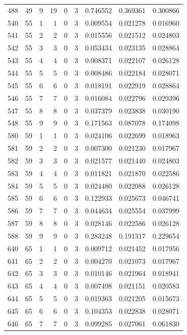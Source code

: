\begin{longtable}{rrrrrrrrr}
488 & 49 & 9 & 19 & 0 & 3 & 0.746552 & 0.369361 & 0.300866 \\
540 & 55 & 1 & 1 & 0 & 3 & 0.009554 & 0.021278 & 0.016960 \\
541 & 55 & 2 & 2 & 0 & 3 & 0.015556 & 0.021512 & 0.024803 \\
542 & 55 & 3 & 3 & 0 & 3 & 0.053434 & 0.023135 & 0.028864 \\
543 & 55 & 4 & 4 & 0 & 3 & 0.008371 & 0.022107 & 0.026128 \\
544 & 55 & 5 & 5 & 0 & 3 & 0.008486 & 0.022184 & 0.028071 \\
545 & 55 & 6 & 6 & 0 & 3 & 0.018191 & 0.022919 & 0.028864 \\
546 & 55 & 7 & 7 & 0 & 3 & 0.016084 & 0.022796 & 0.029396 \\
547 & 55 & 8 & 8 & 0 & 3 & 0.037379 & 0.023838 & 0.030190 \\
548 & 55 & 9 & 9 & 0 & 3 & 0.171563 & 0.087078 & 0.174098 \\
580 & 59 & 1 & 1 & 0 & 3 & 0.024106 & 0.022699 & 0.018963 \\
581 & 59 & 2 & 2 & 0 & 3 & 0.007300 & 0.021230 & 0.017967 \\
582 & 59 & 3 & 3 & 0 & 3 & 0.021577 & 0.021440 & 0.024803 \\
583 & 59 & 4 & 4 & 0 & 3 & 0.011821 & 0.021870 & 0.022586 \\
584 & 59 & 5 & 5 & 0 & 3 & 0.024480 & 0.022088 & 0.026128 \\
585 & 59 & 6 & 6 & 0 & 3 & 0.122933 & 0.025673 & 0.046741 \\
586 & 59 & 7 & 7 & 0 & 3 & 0.044634 & 0.025554 & 0.037999 \\
587 & 59 & 8 & 8 & 0 & 3 & 0.028146 & 0.022586 & 0.026128 \\
588 & 59 & 9 & 9 & 0 & 3 & 0.283248 & 0.191317 & 0.229654 \\
640 & 65 & 1 & 1 & 0 & 3 & 0.009712 & 0.021452 & 0.017956 \\
641 & 65 & 2 & 2 & 0 & 3 & 0.004270 & 0.021073 & 0.017967 \\
642 & 65 & 3 & 3 & 0 & 3 & 0.010146 & 0.021964 & 0.018941 \\
643 & 65 & 4 & 4 & 0 & 3 & 0.007498 & 0.021151 & 0.020583 \\
644 & 65 & 5 & 5 & 0 & 3 & 0.019363 & 0.021205 & 0.015673 \\
645 & 65 & 6 & 6 & 0 & 3 & 0.104353 & 0.022838 & 0.028071 \\
646 & 65 & 7 & 7 & 0 & 3 & 0.099285 & 0.027061 & 0.061830 \\

\end{longtable}
